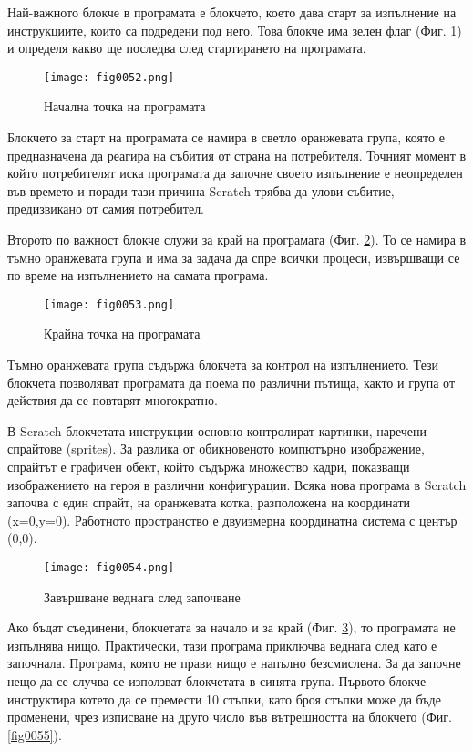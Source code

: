 Най-важното блокче в програмата е блокчето, което дава старт за изпълнение на инструкциите, които са подредени под него. Това блокче има зелен флаг (Фиг. \ref{fig0052}) и определя какво ще последва след стартирането на програмата.

\begin{figure}[H]
  \centering
  \texttt{[image: fig0052.png]}
  \caption{Начална точка на програмата}
\label{fig0052}
\end{figure}

Блокчето за старт на програмата се намира в светло оранжевата група, която е предназначена да реагира на събития от страна на потребителя. Точният момент в който потребителят иска програмата да започне своето изпълнение е неопределен във времето и поради тази причина Scratch трябва да улови събитие, предизвикано от самия потребител. 

Второто по важност блокче служи за край на програмата (Фиг. \ref{fig0053}). То се намира в тъмно оранжевата група и има за задача да спре всички процеси, извършващи се по време на изпълнението на самата програма.

\begin{figure}[H]
  \centering
  \texttt{[image: fig0053.png]}
  \caption{Крайна точка на програмата}
\label{fig0053}
\end{figure}

Тъмно оранжевата група съдържа блокчета за контрол на изпълнението. Тези блокчета позволяват програмата да поема по различни пътища, както и група от действия да се повтарят многократно. 

В Scratch блокчетата инструкции основно контролират картинки, наречени спрайтове (sprites). За разлика от обикновеното компютърно изображение, спрайтът е графичен обект, който съдържа множество кадри, показващи изображението на героя в различни конфигурации. Всяка нова програма в Scratch започва с един спрайт, на оранжевата котка, разположена на координати (x=0,y=0). Работното пространство е двуизмерна координатна система с център (0,0). 

\begin{figure}[H]
  \centering
  \texttt{[image: fig0054.png]}
  \caption{Завършване веднага след започване}
\label{fig0054}
\end{figure}

Ако бъдат съединени, блокчетата за начало и за край (Фиг. \ref{fig0054}), то програмата не изпълнява нищо. Практически, тази програма приключва веднага след като е започнала. Програма, която не прави нищо е напълно безсмислена. За да започне нещо да се случва се използват блокчетата в синята група. Първото блокче инструктира котето да се премести 10 стъпки, като броя стъпки може да бъде променени, чрез изписване на друго число във вътрешността на блокчето (Фиг. \ref{fig0055}).

